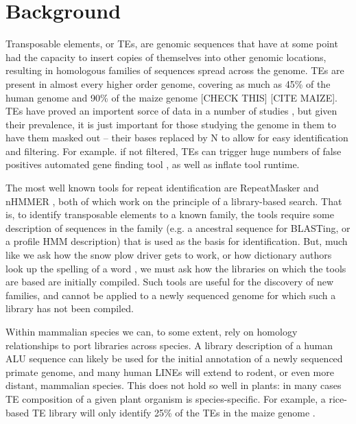 \documentclass{bmcart}
\begin{document}
\newtheorem{definition}{Definition}
\newtheorem{observation}{Observation}
\newtheorem{lemma}{Lemma}
\newtheorem{theorem}{Theorem}

\section*{Background}
Transposable elements, or TEs, are genomic sequences that have at some
point had the capacity to insert copies of themselves into other
genomic locations, resulting in homologous families of sequences
spread across the genome.  TEs are present in almost every higher
order genome, covering as much as 45\% of the human genome and 90\% of
the maize genome [CHECK THIS] \cite{Venter:2001p92} [CITE MAIZE].  TEs
have proved an importent sorce of data in a number of studies
\cite{Arndt:2005p279,Karro:2008p123,Mugal:2009p581,Hardison:2003p97},
but given their prevalence, it is just important for those studying
the genome in them to have them masked out -- their bases replaced by
N to allow for easy identification and filtering.  For example. if not
filtered, TEs can trigger huge numbers of false positives automated
gene finding tool \cite{Jiang:2013jt}, as well as inflate tool
runtime. 

The most well known tools for repeat identification are RepeatMasker
and nHMMER \cite{RepeatMaskerOpen:XkNxXSd7,Wheeler:2013gj}, both of
which work on the principle of a library-based search.  That is, to
identify transposable elements to a known family, the tools require
some description of sequences in the family (e.g. a ancestral sequence
for BLASTing, or a profile HMM description) that is used as the basis
for identification.  But, much like we ask how the snow plow driver
gets to work, or how dictionary authors look up the spelling of a word
\cite{Pratchett:uw}, we must ask how the libraries on which the tools are based are
initially compiled.  Such tools are useful for the discovery of new
families, and cannot be applied to a newly sequenced genome for which
such a library has not been compiled.


Within mammalian species we can, to some extent, rely on homology
relationships to port libraries across species.  A library description
of a human ALU sequence can likely be used for the initial annotation
of a newly sequenced primate genome, and many human LINEs will extend to
rodent, or even more distant, mammalian species.  This does not hold
so well in plants: in many cases TE composition of a given plant organism
is species-specific.  For example, a rice-based TE library will only identify 25\%
of the TEs in the maize genome \cite{Jiang:2013jt}.
\end{document}

